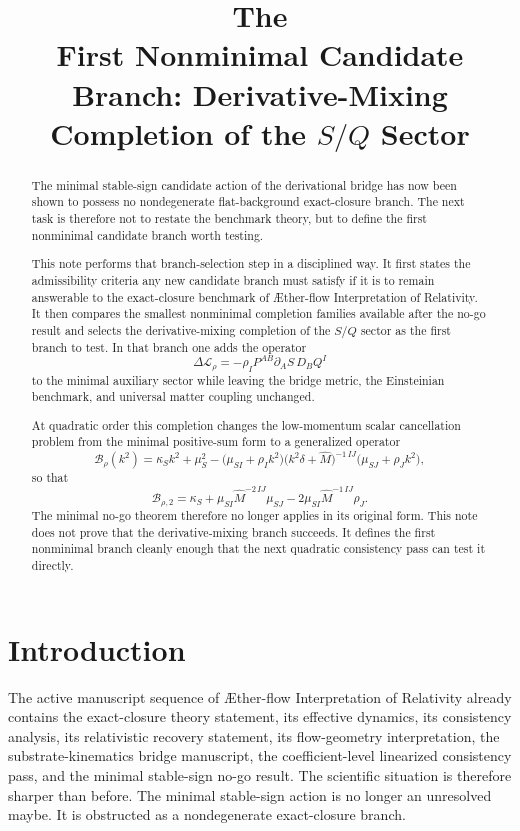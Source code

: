 \documentclass[11pt]{article}
\title{\textbf{The \TheoryName{}}\\[0.4em]
\large First Nonminimal Candidate Branch: Derivative-Mixing Completion of the \(S/Q\) Sector}
\author{}
\date{}
\newcommand{\Aflow}{\AE{}ther-flow}
\newcommand{\TheoryName}{\Aflow{} Interpretation of Relativity}
\begin{document}
\maketitle

\begin{abstract}
The minimal stable-sign candidate action of the derivational bridge has now been shown to possess no nondegenerate flat-background exact-closure branch. The next task is therefore not to restate the benchmark theory, but to define the first nonminimal candidate branch worth testing.

This note performs that branch-selection step in a disciplined way. It first states the admissibility criteria any new candidate branch must satisfy if it is to remain answerable to the exact-closure benchmark of \TheoryName{}. It then compares the smallest nonminimal completion families available after the no-go result and selects the derivative-mixing completion of the \(S/Q\) sector as the first branch to test. In that branch one adds the operator
\[
\Delta\mathcal L_{\rho}
=
-\rho_I P^{AB}\partial_A S\,D_BQ^I
\]
to the minimal auxiliary sector while leaving the bridge metric, the Einsteinian benchmark, and universal matter coupling unchanged.

At quadratic order this completion changes the low-momentum scalar cancellation problem from the minimal positive-sum form to a generalized operator
\[
\mathcal B_{\rho}(k^2)
=
\kappa_Sk^2+\mu_S^2
-\bigl(\mu_{SI}+\rho_Ik^2\bigr)
\bigl(k^2\delta+\widehat M\bigr)^{-1\,IJ}
\bigl(\mu_{SJ}+\rho_Jk^2\bigr),
\]
so that
\[
\mathcal B_{\rho,2}
=
\kappa_S
+\mu_{SI}\widehat M^{-2\,IJ}\mu_{SJ}
-2\mu_{SI}\widehat M^{-1\,IJ}\rho_J.
\]
The minimal no-go theorem therefore no longer applies in its original form. This note does not prove that the derivative-mixing branch succeeds. It defines the first nonminimal branch cleanly enough that the next quadratic consistency pass can test it directly.
\end{abstract}

\section{Introduction}

The active manuscript sequence of \TheoryName{} already contains the exact-closure theory statement, its effective dynamics, its consistency analysis, its relativistic recovery statement, its flow-geometry interpretation, the substrate-kinematics bridge manuscript, the coefficient-level linearized consistency pass, and the minimal stable-sign no-go result. The scientific situation is therefore sharper than before. The minimal stable-sign action is no longer an unresolved maybe. It is obstructed as a nondegenerate exact-closure branch.
\end{document}
